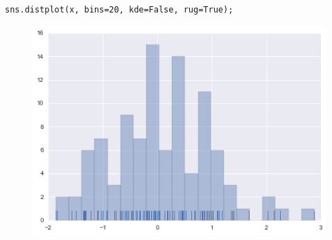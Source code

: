 \documentclass{beamer}
\begin{document}
\begin{frame}[fragile]
\begin{verbatim}
sns.distplot(x, bins=20, kde=False, rug=True);
\end{verbatim}

\begin{figure}
	\centering
	\includegraphics[width=0.7\linewidth]{images/distributions_12_0}
\end{figure}
\end{frame}
\end{document}
